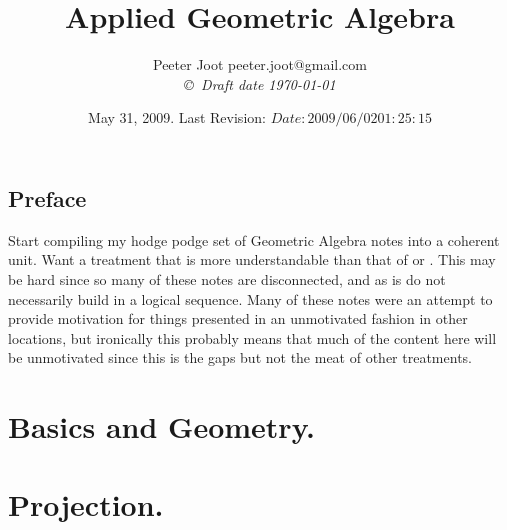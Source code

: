\documentclass[12pt,leqno]{book}
\title{Applied Geometric Algebra}
\author{Peeter Joot  \quad peeter.joot@gmail.com \\
{\small\em \copyright \  Draft date \today }}
\date{ May 31, 2009.  Last Revision: $Date: 2009/06/02 01:25:15 $ }
\begin{document}
\maketitle
\tableofcontents
\listoffigures
\listoftables
\chapter*{Preface}\normalsize
\pagestyle{plain}

Start compiling my hodge podge set of Geometric Algebra notes into a coherent unit.  Want a treatment that is more
understandable than that of 
\cite{doran2003gap} or 
\cite{hestenes1999nfc}.
This may be hard since so many of these notes are disconnected, and as
is do not necessarily build in a logical sequence.  Many of these 
notes were an attempt to provide motivation for things presented in
an unmotivated fashion in other locations, but ironically this probably
means that much of the content here will be unmotivated since this 
is the gaps but not the meat of other treatments.

%

\pagestyle{headings}


\part{Basics and Geometry.}















\part{Projection.}






\end{document}
